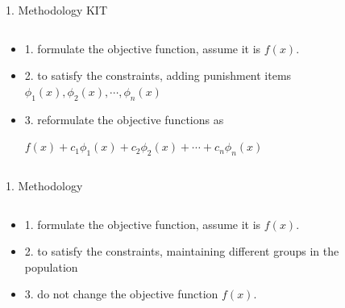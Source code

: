 \documentclass{beamer}
\begin{document}
\begin{frame}{1. Methodology \hfill KIT} 
	\begin{columns}
		\begin{column}{0.65\textwidth}
			\begin{itemize}
				\item  1. formulate the objective function, assume it is $f(x)$.
				\item  2. to satisfy the constraints, adding punishment items
					$\phi_1(x),\phi_2(x),\cdots, \phi_n(x)$ 
				\item  3. reformulate the objective functions as

					$f(x)+c_1\phi_1(x)+c_2\phi_2(x)+ \cdots + c_n\phi_n(x)$
			\end{itemize}
		\end{column}
		\begin{column}{0.35\textwidth}
			
		\end{column}
	\end{columns}
\end{frame}




\begin{frame}{1. Methodology \hfill }
	\begin{columns}
		\begin{column}{0.6\textwidth}
			\begin{itemize}
				\item  1. formulate the objective function, assume it is $f(x)$.
				\item  2. to satisfy the constraints, maintaining different groups in the population 
				\item  3. do not change the objective function $f(x)$.
			\end{itemize}
		\end{column}
		\begin{column}{0.4\textwidth}
			
		\end{column}
	\end{columns}
\end{frame}
\end{document}
